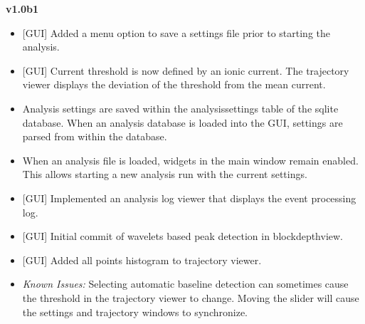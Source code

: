 \documentclass[letterpaper,10pt,english]{sphinxmanual}
\begin{document}
\textbf{v1.0b1}
\begin{itemize}
\item {} 
{[}GUI{]} Added a menu option to save a settings file prior to starting the analysis.

\item {} 
{[}GUI{]} Current threshold is now defined by an ionic current. The trajectory viewer displays the deviation of the threshold from the mean current.

\item {} 
Analysis settings are saved within the analysissettings table of the sqlite database. When an analysis database is loaded into the GUI, settings are parsed from within the database.

\item {} 
When an analysis file is loaded, widgets in the main window remain enabled. This allows starting a new analysis run with the current settings.

\item {} 
{[}GUI{]} Implemented an analysis log viewer that displays the event processing log.

\item {} 
{[}GUI{]} Initial commit of wavelets based peak detection in blockdepthview.

\item {} 
{[}GUI{]} Added all points histogram to trajectory viewer.

\item {} 
\emph{Known Issues:} Selecting automatic baseline detection can sometimes cause the threshold in the trajectory viewer to change. Moving the slider will cause the settings and trajectory windows to synchronize.

\end{itemize}
\end{document}

